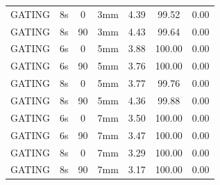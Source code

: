 \documentclass[type=dr, dr=rernat, accentcolor=tud7b,colorbacktitle, bigchapter, openright, twoside, 12pt ]{tudthesis}
\begin{document}
\begin{table}[H]
\begin{tabular}{|c||c|c|c||c|c|c|}
GATING & 8s & 0 & 3mm & 4.39 & 99.52 & 0.00 \\
GATING & 8s & 90 & 3mm & 4.43 & 99.64 & 0.00 \\
GATING & 6s & 0 & 5mm & 3.88 & 100.00 & 0.00 \\
GATING & 6s & 90 & 5mm & 3.76 & 100.00 & 0.00 \\
GATING & 8s & 0 & 5mm & 3.77 & 99.76 & 0.00 \\
GATING & 8s & 90 & 5mm & 4.36 & 99.88 & 0.00 \\
GATING & 6s & 0 & 7mm & 3.50 & 100.00 & 0.00 \\
GATING & 6s & 90 & 7mm & 3.47 & 100.00 & 0.00 \\
GATING & 8s & 0 & 7mm & 3.29 & 100.00 & 0.00 \\
GATING & 8s & 90 & 7mm & 3.17 & 100.00 & 0.00 \\
    \hline\hline 
  \end{tabular}
    \label{tab:Pat01:LPV}
\end{table}

\newpage
\end{document}
